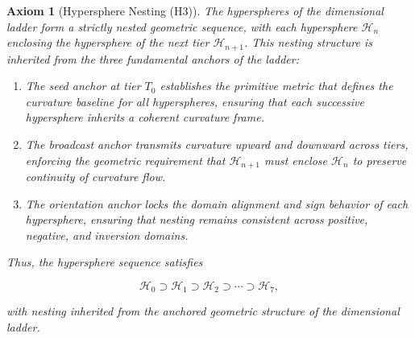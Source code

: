 \documentclass[final,onefignum,onetabnum]{siamart}
\newtheorem{axiom}{Axiom}
\begin{document}
\begin{axiom}[Hypersphere Nesting (H3)]
The hyperspheres of the dimensional ladder form a strictly nested geometric sequence, with each hypersphere $\mathcal{H}_{n}$ enclosing the hypersphere of the next tier $\mathcal{H}_{n+1}$. This nesting structure is inherited from the three fundamental anchors of the ladder:

\begin{enumerate}
\item The seed anchor at tier $T_0$ establishes the primitive metric that defines the curvature baseline for all hyperspheres, ensuring that each successive hypersphere inherits a coherent curvature frame.
\item The broadcast anchor transmits curvature upward and downward across tiers, enforcing the geometric requirement that $\mathcal{H}_{n+1}$ must enclose $\mathcal{H}_{n}$ to preserve continuity of curvature flow.
\item The orientation anchor locks the domain alignment and sign behavior of each hypersphere, ensuring that nesting remains consistent across positive, negative, and inversion domains.
\end{enumerate}

Thus, the hypersphere sequence satisfies


\[
\mathcal{H}_{0} \supset \mathcal{H}_{1} \supset \mathcal{H}_{2} \supset \cdots \supset \mathcal{H}_{7},
\]


with nesting inherited from the anchored geometric structure of the dimensional ladder.
\end{axiom}
\end{document}
